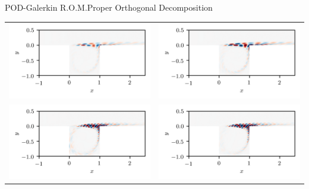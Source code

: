 \documentclass[usenames,dvipsnames,svgnames,10pt,aspectratio=169]{beamer}
\begin{document}
\begin{frame}[t, c]{POD-Galerkin R.O.M.}{Proper Orthogonal Decomposition}
	\centering
	\begin{tabular}{cc}
		\includegraphics[width=.4\textwidth]{PCA_mode_0} & \includegraphics[width=.4\textwidth]{PCA_mode_1} \\
		\includegraphics[width=.4\textwidth]{PCA_mode_2} & \includegraphics[width=.4\textwidth]{PCA_mode_3}
	\end{tabular}
\end{frame}
\end{document}
